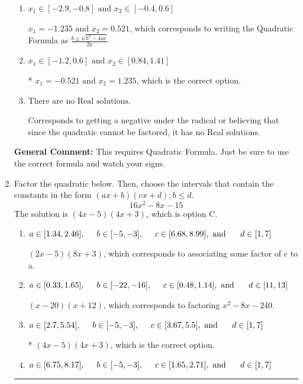 \documentclass{extbook}[14pt]
\newcommand{\litem}[1]{\item #1

\rule{\textwidth}{0.4pt}}
\begin{document}
\begin{enumerate}
{\begin{enumerate}[label=\Alph*.]
 $x_1 = -24.219 \text{ and } x_2 = 24.934$, which corresponds to writing the Quadratic Formula as $-\frac{b}{2a} \pm \sqrt{b^2 - 4ac}$.
\item \( x_1 \in [-2.9, -0.8] \text{ and } x_2 \in [-0.4, 0.6] \)

 $x_1 = -1.235 \text{ and } x_2 = 0.521$, which corresponds to writing the Quadratic Formula as $\frac{b \pm \sqrt{b^2 - 4ac}}{2a}$
\item \( x_1 \in [-1.2, 0.6] \text{ and } x_2 \in [0.84, 1.41] \)

* $x_1 = -0.521 \text{ and } x_2 = 1.235$, which is the correct option.
\item \( \text{There are no Real solutions.} \)

Corresponds to getting a negative under the radical or believing that since the quadratic cannot be factored, it has no Real solutions.
\end{enumerate}

\textbf{General Comment:} This requires Quadratic Formula. Just be sure to use the correct formula and watch your signs.
}
\litem{
Factor the quadratic below. Then, choose the intervals that contain the constants in the form $(ax+b)(cx+d); b \leq d.$
\[ 16x^{2} -8 x -15 \]The solution is \( (4x -5)(4x + 3) \), which is option C.\begin{enumerate}[label=\Alph*.]
\item \( a \in [1.34, 2.46], \hspace*{5mm} b \in [-5, -3], \hspace*{5mm} c \in [6.68, 8.99], \text{ and } \hspace*{5mm} d \in [1, 7] \)

 $(2x -5)(8x + 3)$, which corresponds to associating some factor of c to a.
\item \( a \in [0.33, 1.65], \hspace*{5mm} b \in [-22, -16], \hspace*{5mm} c \in [0.48, 1.14], \text{ and } \hspace*{5mm} d \in [11, 13] \)

 $(x -20)(x + 12)$, which corresponds to factoring $x^{2} -8 x -240$.
\item \( a \in [2.7, 5.54], \hspace*{5mm} b \in [-5, -3], \hspace*{5mm} c \in [3.67, 5.5], \text{ and } \hspace*{5mm} d \in [1, 7] \)

* $(4x -5)(4x + 3)$, which is the correct option.
\item \( a \in [6.75, 8.17], \hspace*{5mm} b \in [-5, -3], \hspace*{5mm} c \in [1.65, 2.71], \text{ and } \hspace*{5mm} d \in [1, 7] \)


\end{enumerate}}
\end{enumerate}
\end{document}
